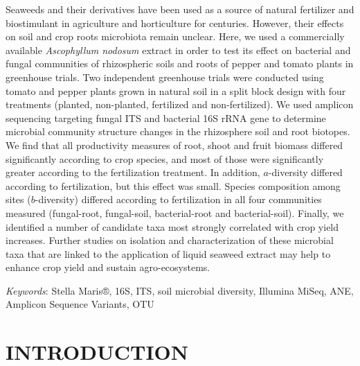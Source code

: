 \documentclass[12pt,]{article}
\renewenvironment{abstract}
 {{%
    \setlength{\leftmargin}{0mm}
    \setlength{\rightmargin}{\leftmargin}%
  }%
  \relax}
 {\endlist}
\begin{document}
\begin{abstract}

    \hbox{\vrule height .2pt width 39.14pc}

    \vskip 8.5pt %

\noindent Seaweeds and their derivatives have been used as a source of natural
fertilizer and biostimulant in agriculture and horticulture for
centuries. However, their effects on soil and crop roots microbiota
remain unclear. Here, we used a commercially available \emph{Ascophyllum
nodosum} extract in order to test its effect on bacterial and fungal
communities of rhizospheric soils and roots of pepper and tomato plants
in greenhouse trials. Two independent greenhouse trials were conducted
using tomato and pepper plants grown in natural soil in a split block
design with four treatments (planted, non-planted, fertilized and
non-fertilized). We used amplicon sequencing targeting fungal ITS and
bacterial 16S rRNA gene to determine microbial community structure
changes in the rhizosphere soil and root biotopes. We find that all
productivity measures of root, shoot and fruit biomass differed
significantly according to crop species, and most of those were
significantly greater according to the fertilization treatment. In
addition, \(a\)-diversity differed according to fertilization, but this
effect was small. Species composition among sites (\(b\)-diversity)
differed according to fertilization in all four communities measured
(fungal-root, fungal-soil, bacterial-root and bacterial-soil). Finally,
we identified a number of candidate taxa most strongly correlated with
crop yield increases. Further studies on isolation and characterization
of these microbial taxa that are linked to the application of liquid
seaweed extract may help to enhance crop yield and sustain
agro-ecosystems.


\vskip 8.5pt \noindent \emph{Keywords}: Stella Maris®, 16S, ITS, soil microbial diversity, Illumina MiSeq, ANE,
Amplicon Sequence Variants, OTU \par

    \hbox{\vrule height .2pt width 39.14pc}



\end{abstract}


\vskip 6.5pt


\noindent \doublespacing \newpage 

\section{INTRODUCTION}\label{introduction}
\end{document}
